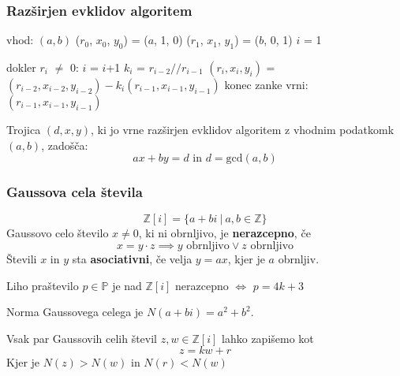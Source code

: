 \subsubsection*{Razširjen evklidov algoritem}
\begin{algorithm}
vhod: $(a, b)$
($r_0$, $x_0$, $y_0$) = ($a$, 1, 0)
($r_1$, $x_1$, $y_1$) = ($b$, 0, 1)
$i$ = 1

dokler $r_i$ $\neq$ 0:
$i$ = $i$+1
$k_i$ = $r_{i-2} // r_{i-1}$
$(r_i, x_i, y_i)$ = $(r_{i-2}, x_{i-2}, y_{i-2}) - k_i(r_{i-1}, x_{i-1}, y_{i-1})$
konec zanke
vrni: $(r_{i-1}, x_{i-1}, y_{i-1})$
\end{algorithm}

Trojica $(d, x, y)$, ki jo vrne razširjen evklidov algoritem z vhodnim podatkomk $(a, b)$, zadošča:
\[ax + by = d \text{ in } d = \textrm{gcd}(a, b)\] 

\subsubsection*{Gaussova cela števila}
\[ \mathbb{Z}[i] = \{a+bi\ |\ a,b \in \mathbb{Z} \}\]
Gaussovo celo število $x \neq 0$, ki ni obrnljivo, je \textbf{nerazcepno}, če
\[ x= y\cdot z \implies y \text{ obrnljivo} \vee z \text{ obrnljivo}\]
Števili $x$ in $y$ sta \textbf{asociativni}, če velja $y = ax$, kjer je $a$ obrnljiv.

Liho praštevilo $p \in \mathbb{P}$ je nad $\mathbb{Z}[i]$ nerazcepno $\iff$ $p = 4k+3$

Norma Gaussovega celega je $N(a+bi) = a^2 + b^2$.

Vsak par Gaussovih celih števil $z, w \in \mathbb{Z}[i]$  lahko zapišemo kot
\[z = kw + r \]
Kjer je $N(z) > N(w)$ in $N(r) < N(w)$